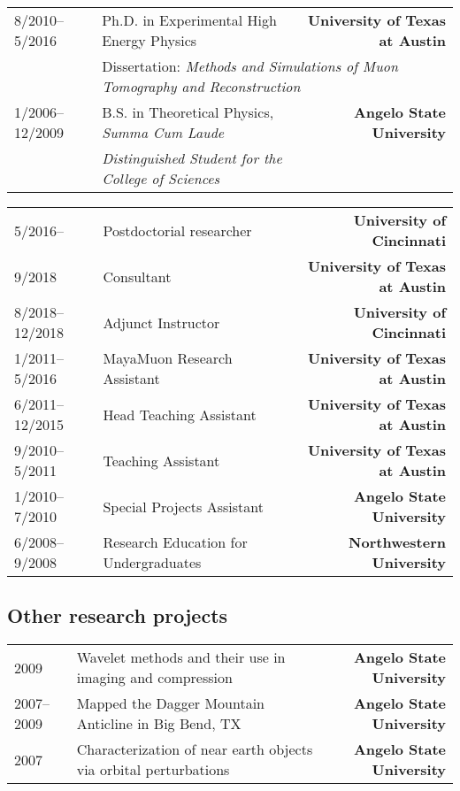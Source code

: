 \documentclass[10pt,letterpaper,english]{moderncv}
\begin{document}
\let\oldnullthing\null
\renewcommand{\null}{}
\makecvtitle
\renewcommand{\null}{\oldnullthing}
\vspace*{-10mm}


\begin{tabularx}{\textwidth}{p{1.1in}X>{\bfseries}r}
	8/2010--5/2016 & Ph.D. in Experimental High Energy Physics &  University of Texas at Austin \\
	& \multicolumn{2}{l}{Dissertation: \textit{Methods and Simulations of Muon Tomography and Reconstruction}} \\[1ex]
	1/2006--12/2009 & B.S. in Theoretical Physics, \textit{Summa Cum Laude} & Angelo State University \\
	& \textit{Distinguished Student for the College of Sciences} & \\
\end{tabularx}


\begin{tabularx}{\textwidth}{p{1.1in}X>{\bfseries}r}
	5/2016-- & Postdoctorial researcher &  University of Cincinnati \\
	9/2018 & Consultant & University of Texas at Austin \\
	8/2018--12/2018 & Adjunct Instructor &  University of Cincinnati \\
	1/2011--5/2016 & MayaMuon Research Assistant & University of Texas at Austin \\
	6/2011--12/2015 & Head Teaching Assistant & University of Texas at Austin \\
	9/2010--5/2011 & Teaching Assistant & University of Texas at Austin \\
	1/2010--7/2010 & Special Projects Assistant & Angelo State University \\
	6/2008--9/2008 & Research Education for Undergraduates & Northwestern University \\
\end{tabularx}

\subsection{Other research projects}

\begin{tabularx}{\textwidth}{p{1.1in}X>{\bfseries}r}
	2009 & Wavelet methods and their use in imaging and compression &  Angelo State University \\
	2007--2009 & Mapped the Dagger Mountain Anticline in Big Bend, TX & Angelo State University \\
	2007 & Characterization of near earth objects via orbital perturbations & Angelo State University \\
\end{tabularx}
\end{document}
